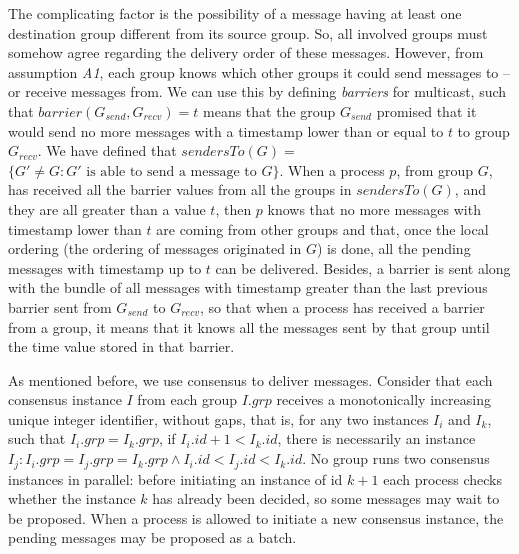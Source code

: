 \documentclass[times, 10pt]{article}
\begin{document}
The complicating factor is the possibility of a message having at least one destination group different from its source group. So, all involved groups must somehow agree regarding the delivery order of these messages. However, from assumption \emph{A1}, each group knows which other groups it could send messages to -- or receive messages from. We can use this by defining \emph{barriers} for multicast, such that \mbox{$barrier(G_{send},G_{recv}) = t$} means that the group $G_{send}$ promised that it would send no more messages with a timestamp lower than or equal to $t$ to group $G_{recv}$. We have defined that $sendersTo(G) =$ \mbox{$\{G' \neq G : G'\text{ is able to send a message to }G\}$}. When a process $p$, from group $G$, has received all the barrier values from all the groups in $sendersTo(G)$, and they are all greater than a value $t$, then $p$ knows that no more messages with timestamp lower than $t$ are coming from other groups and that, once the local ordering (the ordering of messages originated in $G$) is done, all the pending messages with timestamp up to $t$ can be delivered. Besides, a barrier is sent along with the bundle of all messages with timestamp greater than the last previous barrier sent from $G_{send}$ to $G_{recv}$, so that when a process has received a barrier from a group, it means that it knows all the messages sent by that group until the time value stored in that barrier.

As mentioned before, we use consensus to deliver messages. Consider that each consensus instance $I$ from each group $I.grp$ receives a monotonically increasing unique integer identifier, without gaps, that is, for any two instances $I_i$ and $I_k$, such that $I_i.grp = I_k.grp$, if $I_i.id + 1 < I_k.id$, there is necessarily an instance $I_j : I_i.grp = I_j.grp = I_k.grp \wedge I_i.id < I_j.id < I_k.id$. No group runs two consensus instances in parallel: before initiating an instance of id $k+1$ each process checks whether the instance $k$ has already been decided, so some messages may wait to be proposed. When a process is allowed to initiate a new consensus instance, the pending messages may be proposed as a batch.%
\end{document}
